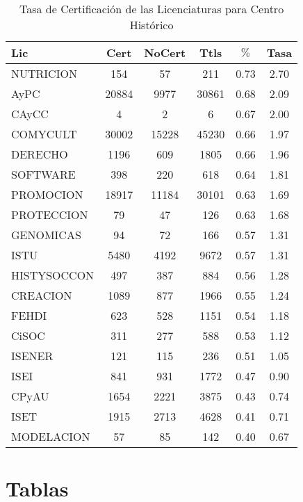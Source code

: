 \documentclass[12pt]{article}
\begin{document}
\begin{table}[h]
\centering
\begin{tabular}{|l|cc|c|cc|}\hline\hline
Lic & Cert & NoCert & Ttls & $\%$ & Tasa \\\hline\hline
NUTRICION & 154 & 57 & 211 & 0.73 & 2.70 \\
AyPC & 20884 & 9977 & 30861 & 0.68 & 2.09 \\
CAyCC & 4 & 2 & 6 & 0.67 & 2.00 \\\hline\hline
COMYCULT & 30002 & 15228 & 45230 & 0.66 & 1.97 \\
DERECHO & 1196 & 609 & 1805 & 0.66 & 1.96 \\
SOFTWARE & 398 & 220 & 618 & 0.64 & 1.81 \\
PROMOCION & 18917 & 11184 & 30101 & 0.63 & 1.69 \\
PROTECCION & 79 & 47 & 126 & 0.63 & 1.68 \\\hline\hline
GENOMICAS & 94 & 72 & 166 & 0.57 & 1.31 \\
ISTU & 5480 & 4192 & 9672 & 0.57 & 1.31 \\
HISTYSOCCON & 497 & 387 & 884 & 0.56 & 1.28 \\
CREACION & 1089 & 877 & 1966 & 0.55 & 1.24 \\
FEHDI & 623 & 528 & 1151 & 0.54 & 1.18 \\
CiSOC & 311 & 277 & 588 & 0.53 & 1.12 \\
ISENER & 121 & 115 & 236 & 0.51 & 1.05 \\\hline\hline
ISEI & 841 & 931 & 1772 & 0.47 & 0.90 \\
CPyAU & 1654 & 2221 & 3875 & 0.43 & 0.74 \\
ISET & 1915 & 2713 & 4628 & 0.41 & 0.71 \\
MODELACION & 57 & 85 & 142 & 0.40 & 0.67 \\\hline\hline
\end{tabular}
\caption{Tasa de Certificación de las Licenciaturas para Centro Histórico}
\end{table}


\section{Tablas}
\end{document}
